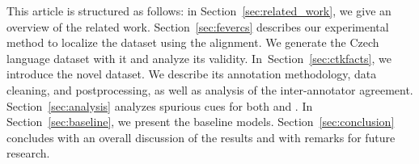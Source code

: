This article is structured as follows: in Section~\ref{sec:related_work}, we give an overview of the related work.
Section~\ref{sec:fevercs} describes our experimental method to localize the \FEN dataset using the \MediaWiki alignment.
We generate the Czech language \FCZ dataset with it and analyze its validity.
In~Section~\ref{sec:ctkfacts}, we introduce the novel \CTK dataset.
We describe its annotation methodology, data cleaning, and postprocessing, as well as analysis of the inter-annotator agreement.
Section~\ref{sec:analysis} analyzes spurious cues for both \FCZ and \CTK.
In Section~\ref{sec:baseline}, we present the baseline models.
Section~\ref{sec:conclusion} concludes with an overall discussion of the results and with remarks for future research.

